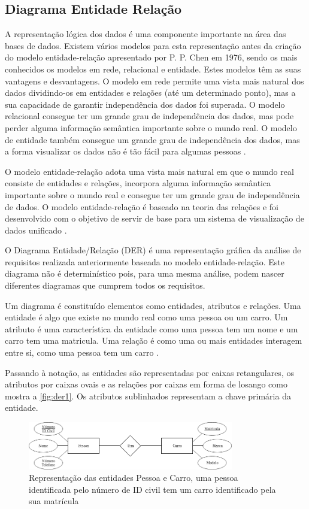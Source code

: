 \documentclass[11pt,twoside,a4paper]{report}
\begin{document}
\subsection{Diagrama Entidade Relação}
\label{subchap:DER}
A representação lógica dos dados é uma componente importante na área das bases de dados. Existem vários modelos para esta representação antes da criação do modelo entidade-relação apresentado por P. P. Chen em 1976, sendo os mais conhecidos os modelos em rede, relacional e entidade. Estes modelos têm as suas vantagens e desvantagens. O modelo em rede permite uma vista mais natural dos dados dividindo-os em entidades e relações (até um determinado ponto), mas a sua capacidade de garantir independência dos dados foi superada. O modelo relacional consegue ter um grande grau de independência dos dados, mas pode perder alguma informação semântica importante sobre o mundo real. O modelo de entidade também consegue um grande grau de independência dos dados, mas a forma visualizar os dados não é tão fácil para algumas pessoas \cite{Chen}.\par
O modelo entidade-relação adota uma vista mais natural em que o mundo real consiste de entidades e relações, incorpora alguma informação semântica importante sobre o mundo real e consegue ter um grande grau de independência de dados. O modelo entidade-relação é baseado na teoria das relações e foi desenvolvido com o objetivo de servir de base para um sistema de visualização de dados unificado \cite{Chen}.\par
O Diagrama Entidade/Relação (DER) é uma representação gráfica da análise de requisitos realizada anteriormente baseada no modelo entidade-relação. Este diagrama não é determinístico pois, para uma mesma análise, podem nascer diferentes diagramas que cumprem todos os requisitos.\par
Um diagrama é constituído elementos como entidades, atributos e relações. Uma entidade é algo que existe no mundo real como uma pessoa ou um carro. Um atributo é uma característica da entidade como uma pessoa tem um nome e um carro tem uma matricula. Uma relação é como uma ou mais entidades interagem entre si, como uma pessoa tem um carro \cite{Chen}.\par 
Passando à notação, as entidades são representadas por caixas retangulares, os atributos por caixas ovais e as relações por caixas em forma de losango como mostra a \autoref{fig:der1}. Os atributos sublinhados representam a chave primária da entidade.
\begin{figure}[H]
	\begin{center}
		\includegraphics[width=0.8\textwidth]{notacao1} %
		\caption[Representação de entidades, relações e atributos]{Representação das entidades Pessoa e Carro, uma pessoa identificada pelo número de ID civil tem um carro identificado pela sua matrícula}
		\label{fig:der1}
	\end{center}
\end{figure}
\end{document}
